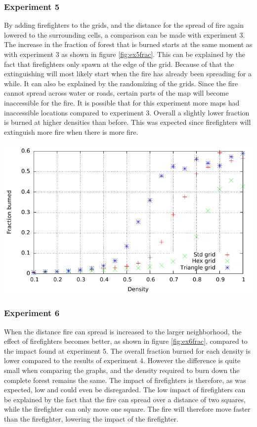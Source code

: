 \documentclass{article}
\newenvironment{Figure}
  {\par\medskip\noindent\minipage{\linewidth}}
  {\endminipage\par\medskip}
\begin{document}
\begin{multicols}{2}
\subsubsection*{Experiment 5}
By adding firefighters to the grids, and the distance for the spread of fire again lowered to the surrounding cells, a comparison can be made with experiment 3. The increase in the fraction of forest that is burned starts at the same moment as with experiment 3 as shown in figure \ref{fig:ex5frac}. This can be explained by the fact that firefighters only spawn at the edge of the grid. Because of that the extinguishing will most likely start when the fire has already been spreading for a while. It can also be explained by the randomizing of the grids. Since the fire cannot spread across water or roads, certain parts of the map will become inaccessible for the fire. It is possible that for this experiment more maps had inaccessible locations compared to experiment 3. Overall a slightly lower fraction is burned at higher densities than before. This was expected since firefighters will extinguish more fire when there is more fire.

\begin{Figure}
 \centering
 \includegraphics[width=\textwidth]{imgs/plot/ex5/fracburned.pdf}
\label{fig:ex5frac}
\end{Figure}
\subsubsection*{Experiment 6}
When the distance fire can spread is increased to the larger neighborhood, the effect of firefighters becomes better, as shown in figure \ref{fig:ex6frac}, compared to the impact found at experiment 5. The overall fraction burned for each density is lower compared to the results of experiment 4. However the difference is quite small when comparing the graphs, and the density required to burn down the complete forest remains the same. The impact of firefighters is therefore, as was expected, low and could even be disregarded. The low impact of firefighters can be explained by the fact that the fire can spread over a distance of two squares, while the firefighter can only move one square. The fire will therefore move faster than the firefighter, lowering the impact of the firefighter.


\end{multicols}
\end{document}
